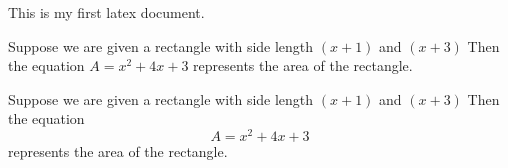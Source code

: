 \documentclass[11pt]{article}
\begin{document}
This is my first latex document.

Suppose we are given a rectangle with side length 
$(x+1)$ and $(x+3)$ 
Then the equation 
$A = x^2+4x+3$ represents the area of the rectangle. 


Suppose we are given a rectangle with side length 
$(x+1)$ and $(x+3)$ 
Then the equation 
$$A = x^2+4x+3$$ represents the area of the rectangle. 
\end{document}
